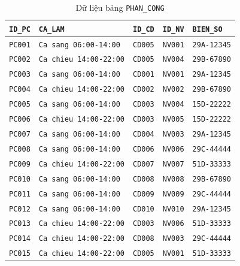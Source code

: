 \documentclass[11pt]{report}
\begin{document}
\begin{table}[H]
    \centering
    \renewcommand{\tabularxcolumn}[1]{m{#1}}
    \begin{tabularx}{\textwidth}{|l|l|l|l|>{\raggedright\arraybackslash}X|} \hline
        \rowcolor{teal!30}
        \textbf{\texttt{ID\_PC}} & \textbf{\texttt{CA\_LAM}} & \textbf{\texttt{ID\_CD}} & \textbf{\texttt{ID\_NV}} & \textbf{\texttt{BIEN\_SO}} \\ \hline
        \texttt{PC001} & \texttt{Ca sang 06:00-14:00}  & \texttt{CD005} & \texttt{NV001} & \texttt{29A-12345} \\ \hline
        \texttt{PC002} & \texttt{Ca chieu 14:00-22:00} & \texttt{CD005} & \texttt{NV004} & \texttt{29B-67890} \\ \hline
        \texttt{PC003} & \texttt{Ca sang 06:00-14:00}  & \texttt{CD001} & \texttt{NV001} & \texttt{29A-12345} \\ \hline
        \texttt{PC004} & \texttt{Ca chieu 14:00-22:00} & \texttt{CD002} & \texttt{NV002} & \texttt{29B-67890} \\ \hline
        \texttt{PC005} & \texttt{Ca sang 06:00-14:00}  & \texttt{CD003} & \texttt{NV004} & \texttt{15D-22222} \\ \hline
        \texttt{PC006} & \texttt{Ca chieu 14:00-22:00} & \texttt{CD003} & \texttt{NV005} & \texttt{15D-22222} \\ \hline
        \texttt{PC007} & \texttt{Ca sang 06:00-14:00}  & \texttt{CD004} & \texttt{NV003} & \texttt{29A-12345} \\ \hline
        \texttt{PC008} & \texttt{Ca sang 06:00-14:00}  & \texttt{CD006} & \texttt{NV006} & \texttt{29C-44444} \\ \hline
        \texttt{PC009} & \texttt{Ca chieu 14:00-22:00} & \texttt{CD007} & \texttt{NV007} & \texttt{51D-33333} \\ \hline
        \texttt{PC010} & \texttt{Ca sang 06:00-14:00}  & \texttt{CD008} & \texttt{NV008} & \texttt{29B-67890} \\ \hline
        \texttt{PC011} & \texttt{Ca sang 06:00-14:00}  & \texttt{CD009} & \texttt{NV009} & \texttt{29C-44444} \\ \hline
        \texttt{PC012} & \texttt{Ca sang 06:00-14:00}  & \texttt{CD010} & \texttt{NV010} & \texttt{29A-12345} \\ \hline
        \texttt{PC013} & \texttt{Ca chieu 14:00-22:00} & \texttt{CD003} & \texttt{NV006} & \texttt{51D-33333} \\ \hline
        \texttt{PC014} & \texttt{Ca chieu 14:00-22:00} & \texttt{CD008} & \texttt{NV003} & \texttt{29C-44444} \\ \hline
        \texttt{PC015} & \texttt{Ca chieu 14:00-22:00} & \texttt{CD005} & \texttt{NV001} & \texttt{51D-33333} \\ \hline
    \end{tabularx}
    \caption{Dữ liệu bảng \texttt{PHAN\_CONG}}
    \label{tab:data_pc}
\end{table}
\end{document}
